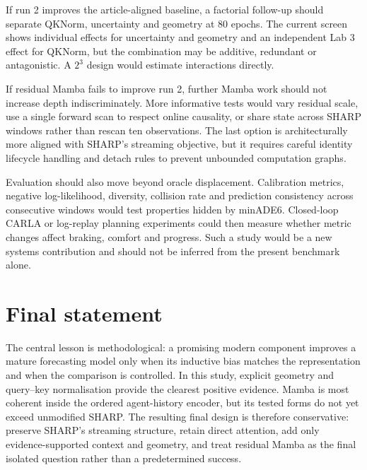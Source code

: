 If run 2 improves the article-aligned baseline, a factorial follow-up should separate QKNorm, uncertainty and geometry at 80 epochs. The current screen shows individual effects for uncertainty and geometry and an independent Lab 3 effect for QKNorm, but the combination may be additive, redundant or antagonistic. A $2^3$ design would estimate interactions directly.

If residual Mamba fails to improve run 2, further Mamba work should not increase depth indiscriminately. More informative tests would vary residual scale, use a single forward scan to respect online causality, or share state across SHARP windows rather than rescan ten observations. The last option is architecturally more aligned with SHARP's streaming objective, but it requires careful identity lifecycle handling and detach rules to prevent unbounded computation graphs.

Evaluation should also move beyond oracle displacement. Calibration metrics, negative log-likelihood, diversity, collision rate and prediction consistency across consecutive windows would test properties hidden by minADE6. Closed-loop CARLA or log-replay planning experiments could then measure whether metric changes affect braking, comfort and progress. Such a study would be a new systems contribution and should not be inferred from the present benchmark alone.

\section{Final statement}

The central lesson is methodological: a promising modern component improves a mature forecasting model only when its inductive bias matches the representation and when the comparison is controlled. In this study, explicit geometry and query--key normalisation provide the clearest positive evidence. Mamba is most coherent inside the ordered agent-history encoder, but its tested forms do not yet exceed unmodified SHARP. The resulting final design is therefore conservative: preserve SHARP's streaming structure, retain direct attention, add only evidence-supported context and geometry, and treat residual Mamba as the final isolated question rather than a predetermined success.
